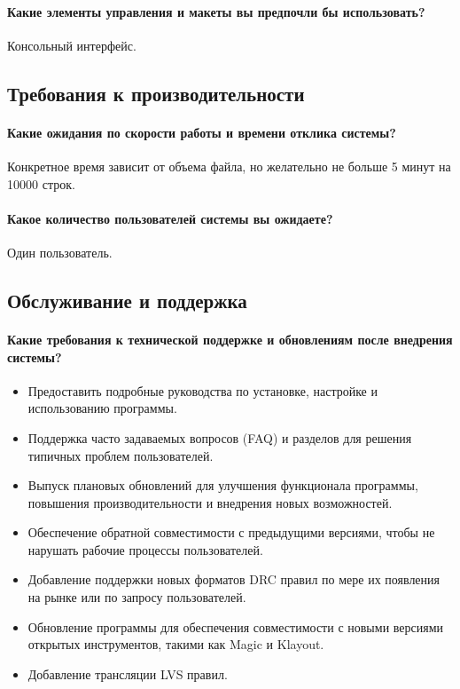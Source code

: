 \paragraph{Какие элементы управления и макеты вы предпочли бы использовать?}
Консольный интерфейс.

\subsection{Требования к производительности}

\paragraph{Какие ожидания по скорости работы и времени отклика системы?}
Конкретное время зависит от объема файла,
но желательно не больше 5 минут на 10000 строк.\par

\paragraph{Какое количество пользователей системы вы ожидаете?}
Один пользователь.

\subsection{Обслуживание и поддержка}

\paragraph{Какие требования к технической поддержке
	и обновлениям после внедрения системы?}

\begin{itemize}
	\item Предоставить подробные руководства по установке,
		настройке и использованию программы.
	\item Поддержка часто задаваемых вопросов (FAQ)
		и разделов для решения типичных проблем пользователей.
	\item Выпуск плановых обновлений для улучшения функционала программы,
		повышения производительности и внедрения новых возможностей.
	\item Обеспечение обратной совместимости с предыдущими версиями,
		чтобы не нарушать рабочие процессы пользователей.
	\item Добавление поддержки новых форматов DRC правил по мере
		их появления на рынке или по запросу пользователей.
	\item Обновление программы для обеспечения совместимости
		с новыми версиями открытых инструментов, такими как Magic и Klayout.
	\item Добавление трансляции LVS правил.
\end{itemize}

